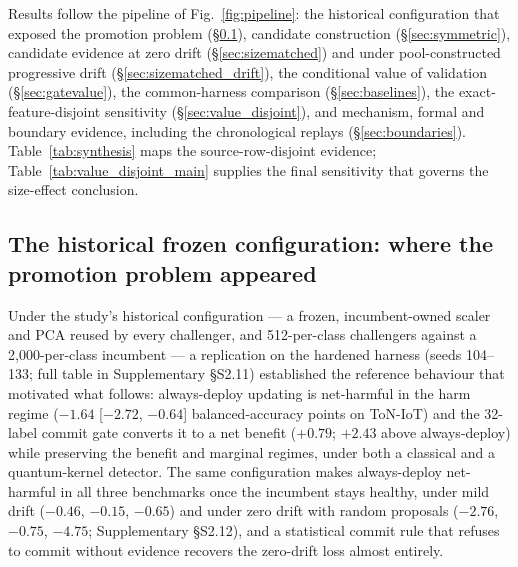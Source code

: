 \documentclass[journal]{IEEEtran}
\begin{document}
Results follow the pipeline of Fig.~\ref{fig:pipeline}: the historical configuration that exposed the promotion problem (\S\ref{sec:historical}), candidate construction (\S\ref{sec:symmetric}), candidate evidence at zero drift (\S\ref{sec:sizematched}) and under pool-constructed progressive drift (\S\ref{sec:sizematched_drift}), the conditional value of validation (\S\ref{sec:gatevalue}), the common-harness comparison (\S\ref{sec:baselines}), the exact-feature-disjoint sensitivity (\S\ref{sec:value_disjoint}), and mechanism, formal and boundary evidence, including the chronological replays (\S\ref{sec:boundaries}). Table~\ref{tab:synthesis} maps the source-row-disjoint evidence; Table~\ref{tab:value_disjoint_main} supplies the final sensitivity that governs the size-effect conclusion.



\subsection{The historical frozen configuration: where the promotion problem appeared}
\label{sec:historical}

Under the study's historical configuration --- a frozen, incumbent-owned scaler and PCA reused by every challenger, and 512-per-class challengers against a 2{,}000-per-class incumbent --- a replication on the hardened harness (seeds 104--133; full table in Supplementary \S S2.11) established the reference behaviour that motivated what follows: always-deploy updating is net-harmful in the harm regime ($-1.64$ [$-2.72$, $-0.64$] balanced-accuracy points on ToN-IoT) and the 32-label commit gate converts it to a net benefit ($+0.79$; $+2.43$ above always-deploy) while preserving the benefit and marginal regimes, under both a classical and a quantum-kernel detector. The same configuration makes always-deploy net-harmful in all three benchmarks once the incumbent stays healthy, under mild drift ($-0.46$, $-0.15$, $-0.65$) and under zero drift with random proposals ($-2.76$, $-0.75$, $-4.75$; Supplementary \S S2.12), and a statistical commit rule that refuses to commit without evidence recovers the zero-drift loss almost entirely.
\end{document}
